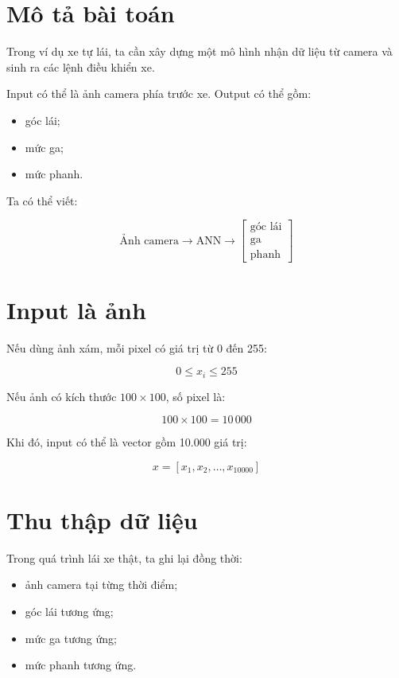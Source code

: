 \documentclass[12pt,a4paper]{report}
\begin{document}
\section{Mô tả bài toán}

Trong ví dụ xe tự lái, ta cần xây dựng một mô hình nhận dữ liệu từ camera và sinh ra các lệnh điều khiển xe.

Input có thể là ảnh camera phía trước xe. Output có thể gồm:

\begin{itemize}
    \item góc lái;
    \item mức ga;
    \item mức phanh.
\end{itemize}

Ta có thể viết:

\[
    \text{Ảnh camera} \rightarrow \text{ANN} \rightarrow
    \begin{bmatrix}
    \text{góc lái}\\
    \text{ga}\\
    \text{phanh}
    \end{bmatrix}
\]

\section{Input là ảnh}

Nếu dùng ảnh xám, mỗi pixel có giá trị từ 0 đến 255:

\[
    0 \leq x_i \leq 255
\]

Nếu ảnh có kích thước $100 \times 100$, số pixel là:

\[
    100 \times 100 = 10\,000
\]

Khi đó, input có thể là vector gồm 10.000 giá trị:

\[
    x = [x_1, x_2, \ldots, x_{10000}]
\]

\section{Thu thập dữ liệu}

Trong quá trình lái xe thật, ta ghi lại đồng thời:

\begin{itemize}
    \item ảnh camera tại từng thời điểm;
    \item góc lái tương ứng;
    \item mức ga tương ứng;
    \item mức phanh tương ứng.
\end{itemize}
\end{document}

